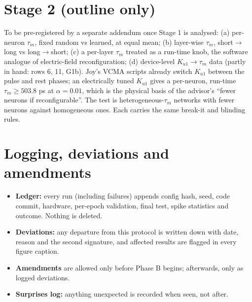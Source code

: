 \documentclass[10pt,a4paper]{article}
\newcommand{\taum}{\tau_m}
\begin{document}
\section{Stage 2 (outline only)}\label{sec:stage2}
To be pre-registered by a separate addendum once Stage 1 is analysed: (a) per-neuron $\taum$, fixed random vs learned, at equal mean; (b) layer-wise $\taum$, short$\to$long vs long$\to$short; (c) a per-layer $\taum$ treated as a run-time knob, the software analogue of electric-field reconfiguration; (d) device-level $K_{u1}\to\taum$ data (partly in hand: rows 6, 11, G1b). Joy's VCMA scripts already switch $K_{u1}$ between the pulse and rest phases; an electrically tuned $K_{u1}$ gives a per-neuron, run-time $\taum\ge503.8$ ps at $\alpha=0.01$, which is the physical basis of the advisor's ``fewer neurons if reconfigurable''. The test is heterogeneous-$\taum$ networks with fewer neurons against homogeneous ones. Each carries the same break-it and blinding rules.

\section{Logging, deviations and amendments}\label{sec:log}
\begin{itemize}
\item \textbf{Ledger:} every run (including failures) appends config hash, seed, code commit, hardware, per-epoch validation, final test, spike statistics and outcome. Nothing is deleted.
\item \textbf{Deviations:} any departure from this protocol is written down with date, reason and the second signature, and affected results are flagged in every figure caption.
\item \textbf{Amendments} are allowed only before Phase B begins; afterwards, only as logged deviations.
\item \textbf{Surprises log:} anything unexpected is recorded when seen, not after.
\end{itemize}
\end{document}
